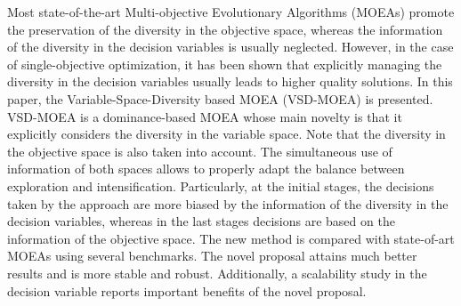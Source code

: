 Most state-of-the-art Multi-objective Evolutionary Algorithms (MOEAs) promote the preservation of the diversity 
in the objective space, whereas the information of the diversity in the decision variables is usually neglected.
%
However, in the case of single-objective optimization, it has been shown that explicitly managing the diversity in the decision
variables usually leads to higher quality solutions.
%
In this paper, the Variable-Space-Diversity based MOEA (VSD-MOEA) is presented.
%
VSD-MOEA is a dominance-based MOEA whose main novelty is that it explicitly considers the diversity in the variable space.
%
Note that the diversity in the objective space is also taken into account.
%
The simultaneous use of information of both spaces allows to properly adapt the balance between exploration and intensification.
%
Particularly, at the initial stages, the decisions taken by the approach are more biased by the information of the diversity in the decision
variables, whereas in the last stages decisions are based on the information of the objective space.
%
The new method is compared with state-of-art MOEAs using several benchmarks.
%
The novel proposal attains much better results and is more stable and robust.
%
Additionally, a scalability study in the decision variable reports important benefits of the novel proposal.
